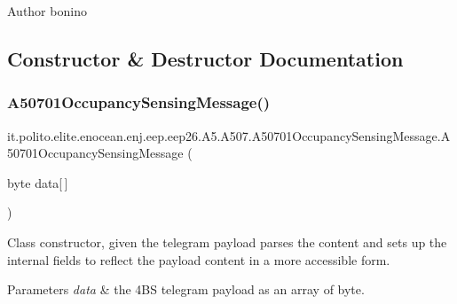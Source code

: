 \begin{DoxyAuthor}{Author}
bonino 
\end{DoxyAuthor}


\subsection{Constructor \& Destructor Documentation}
\hypertarget{classit_1_1polito_1_1elite_1_1enocean_1_1enj_1_1eep_1_1eep26_1_1_a5_1_1_a507_1_1_a50701_occupancy_sensing_message_a60c9c3f7b526efe2a17989ffe8dd0161}{}\label{classit_1_1polito_1_1elite_1_1enocean_1_1enj_1_1eep_1_1eep26_1_1_a5_1_1_a507_1_1_a50701_occupancy_sensing_message_a60c9c3f7b526efe2a17989ffe8dd0161} 
\subsubsection{\texorpdfstring{A50701\+Occupancy\+Sensing\+Message()}{A50701OccupancySensingMessage()}}
{\footnotesize\ttfamily it.\+polito.\+elite.\+enocean.\+enj.\+eep.\+eep26.\+A5.\+A507.\+A50701\+Occupancy\+Sensing\+Message.\+A50701\+Occupancy\+Sensing\+Message (\begin{DoxyParamCaption}\item[{byte}]{data\mbox{[}$\,$\mbox{]} }\end{DoxyParamCaption})}

Class constructor, given the telegram payload parses the content and sets up the internal fields to reflect the payload content in a more accessible form.


\begin{DoxyParams}{Parameters}
{\em data} & the 4\+BS telegram payload as an array of byte. \\
\hline
\end{DoxyParams}


